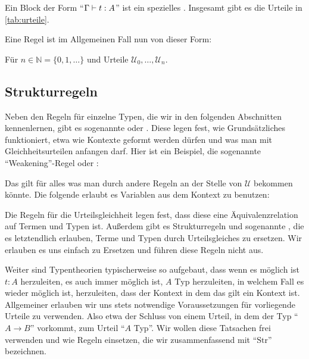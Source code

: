 \documentclass[a4paper,12pt]{article}
\theoremstyle{break}
\theoremstyle{nonumberbreak}
\theoremstyle{nonumberplain}
\begin{document}
Ein Block der Form ``$\Gamma \yields t : A$''  ist ein spezielles .
Insgesamt gibt es die Urteile in \cref{tab:urteile}.

Eine Regel ist im Allgemeinen Fall nun von dieser Form:
\begin{mathpar}
\end{mathpar}
Für $n\in\mathbb N=\{0,1,\dots\}$ und Urteile $\mathcal U_0,\dots,\mathcal U_n$.

\subsection*{Strukturregeln}

Neben den Regeln für einzelne Typen, die wir in den folgenden Abschnitten kennenlernen, gibt es sogenannte  oder .
Diese legen fest, wie Grundsätzliches funktioniert, etwa wie Kontexte geformt werden dürfen und was man mit Gleichheitsurteilen anfangen darf.
Hier ist ein Beispiel, die sogenannte ``Weakening''-Regel oder :
\begin{mathpar}
\end{mathpar}
Das gilt für alles was man durch andere Regeln an der Stelle von $\mathcal U$ bekommen könnte.
Die folgende  erlaubt es Variablen aus dem Kontext zu benutzen:
\begin{mathpar}
\end{mathpar}
Die Regeln für die Urteilsgleichheit legen fest, dass diese eine Äquivalenzrelation auf Termen und Typen ist.
Außerdem gibt es Strukturregeln und sogenannte , die es letztendlich erlauben, Terme und Typen durch Urteilsgleiches zu ersetzen.
Wir erlauben es uns einfach zu Ersetzen und führen diese Regeln nicht aus.

Weiter sind Typentheorien typischerweise so aufgebaut, dass wenn es möglich ist $t:A$ herzuleiten, es auch immer möglich ist, $A\text{ Typ}$ herzuleiten,
in welchem Fall es wieder möglich ist, herzuleiten, dass der Kontext in dem das gilt ein Kontext ist.
Allgemeiner erlauben wir uns stets notwendige Voraussetzungen für vorliegende Urteile zu verwenden.
Also etwa der Schluss von einem Urteil, in dem der Typ ``$A\to B$'' vorkommt, zum Urteil ``$A$ Typ''.
Wir wollen diese Tatsachen frei verwenden und wie Regeln einsetzen, die wir zusammenfassend mit ``$\mathrm{Str}$'' bezeichnen.
\end{document}
